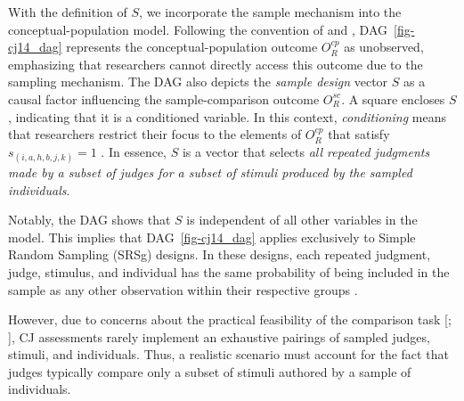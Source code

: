 \documentclass[
  authoryear,
  review,
  1p]{elsarticle}
\begin{document}
With the definition of \(S\), we incorporate the sample mechanism into
the conceptual-population model. Following the convention of
\citet{McElreath_2020} and \citet{Deffner_et_al_2022},
DAG~\ref{fig-cj14_dag} represents the conceptual-population outcome
\(O^{cp}_{R}\) as unobserved, emphasizing that researchers cannot
directly access this outcome due to the sampling mechanism. The DAG also
depicts the \emph{sample design} vector \(S\) as a causal factor
influencing the sample-comparison outcome \(O^{sc}_{R}\). A square
encloses \(S\), indicating that it is a conditioned variable. In this
context, \emph{conditioning} means that researchers restrict their focus
to the elements of \(O^{cp}_{R}\) that satisfy \(s_{(i,a,h,b,j,k)}=1\)
\citep{Neal_2020, McElreath_2020}. In essence, \(S\) is a vector that
selects \emph{all repeated judgments made by a subset of judges for a
subset of stimuli produced by the sampled individuals}.

Notably, the DAG shows that \(S\) is independent of all other variables
in the model. This implies that DAG~\ref{fig-cj14_dag} applies
exclusively to Simple Random Sampling (SRSg) designs. In these designs,
each repeated judgment, judge, stimulus, and individual has the same
probability of being included in the sample as any other observation
within their respective groups \citep{Lawson_2015}.

However, due to concerns about the practical feasibility of the
comparison task {[}\citet{Boonen_et_al_2020}; {]}, CJ assessments rarely
implement an exhaustive pairings of sampled judges, stimuli, and
individuals. Thus, a realistic scenario must account for the fact that
judges typically compare only a subset of stimuli authored by a sample
of individuals.
\end{document}
